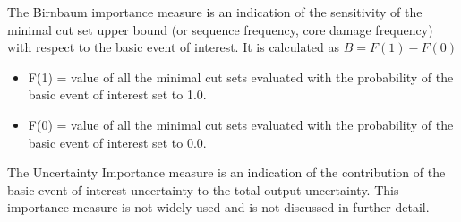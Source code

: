 The Birnbaum importance measure is an indication of the sensitivity of the minimal cut set upper bound (or sequence frequency, core damage frequency) with respect to the basic event of interest. It is calculated as $B=F(1)-F(0)$
\begin{itemize} 
  \item F(1) = value of all the minimal cut sets evaluated with the probability of the basic event of interest set to 1.0.
  \item F(0) = value of all the minimal cut sets evaluated with the probability of the basic event of interest set to 0.0.
 \end{itemize}
  
The Uncertainty Importance measure is an indication of the contribution of the  basic event of interest uncertainty to the total output uncertainty. This importance measure is not widely used and is not discussed in further detail.


